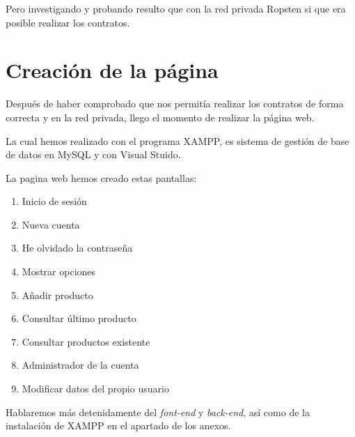 Pero investigando y probando resulto que con la red privada Ropsten si que era posible realizar los contratos.

\section{Creación de la página}

Después de haber comprobado que nos permitía realizar los contratos de forma correcta y en la red privada, llego el momento de realizar la página web.

La cual hemos realizado con el programa XAMPP, es sistema de gestión de base de datos en MySQL y con Visual Stuido.

La pagina web hemos creado estas pantallas:
\begin{enumerate}[a]
	\item Inicio de sesión
	\item Nueva cuenta
	\item He olvidado la contraseña
	\item Mostrar opciones
	\item Añadir producto
	\item Consultar último producto
	\item Consultar productos existente
	\item Administrador de la cuenta
	\item Modificar datos del propio usuario
\end{enumerate}

Hablaremos más detenidamente del \textit{font-end} y \textit{back-end}, así como de la instalación de XAMPP en el apartado de los anexos.
